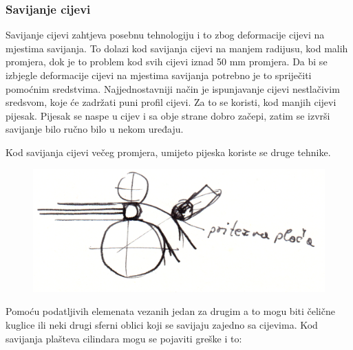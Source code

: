 \documentclass[a4paper,12pt]{article}
\numberwithin{figure}{section}
\begin{document}
\subsubsection{Savijanje cijevi}
Savijanje cijevi zahtjeva posebnu tehnologiju i to zbog deformacije cijevi na mjestima savijanja. To dolazi kod savijanja cijevi na manjem radijusu, kod malih promjera, dok je to problem kod svih cijevi iznad 50 mm promjera. Da bi se izbjegle deformacije cijevi na mjestima savijanja potrebno je to spriječiti pomoćnim sredstvima. Najjednostavniji način je ispunjavanje cijevi nestlačivim sredsvom, koje će zadržati puni profil cijevi. Za to se koristi, kod manjih cijevi pijesak. Pijesak se naspe u cijev i sa obje strane dobro začepi, zatim se izvrši savijanje bilo ručno bilo u nekom uređaju. \par
Kod savijanja cijevi večeg promjera, umijeto pijeska koriste se druge tehnike.
\begin{figure}[!h]
\centering
\includegraphics[scale=0.14]{image_51-2.png}
\end{figure}
\FloatBarrier
Pomoću podatljivih elemenata vezanih jedan za drugim a to mogu biti čelične kuglice ili neki drugi sferni oblici koji se savijaju zajedno sa cijevima. Kod savijanja plašteva cilindara mogu se pojaviti greške i to:
\end{document}
